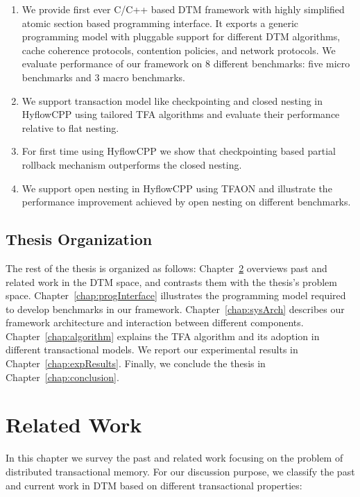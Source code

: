 \documentclass[12pt,english]{report}
\begin{document}
\begin{enumerate}
\item We provide first ever C/C++ based DTM framework with highly simplified atomic section based programming interface. It exports a generic programming model with pluggable support for different DTM algorithms, cache coherence protocols, contention policies, and network protocols. We evaluate performance of our framework on 8 different benchmarks: five micro benchmarks and 3 macro benchmarks.
\item We support transaction model like checkpointing and closed nesting in HyflowCPP using tailored TFA algorithms and evaluate their performance relative to flat nesting.  
\item For first time using HyflowCPP we show that checkpointing based partial rollback mechanism outperforms  the closed nesting. 
\item We support open nesting in HyflowCPP using TFAON and illustrate the performance improvement achieved by open nesting on different benchmarks.
\end{enumerate}

\section{Thesis Organization}

The rest of the thesis is organized as follows: Chapter~\ref{chap:relWork} overviews past and related work in the DTM space, and contrasts them with the thesis's problem space. Chapter~\ref{chap:progInterface} illustrates the programming model required to develop benchmarks in our framework. Chapter~\ref{chap:sysArch} describes our framework architecture and interaction between different components. Chapter~\ref{chap:algorithm} explains the TFA algorithm and its adoption in different transactional models. We report our experimental results in Chapter~\ref{chap:expResults}. Finally, we conclude the thesis in Chapter~\ref{chap:conclusion}.

\chapter{Related Work}\label{chap:relWork}

In this chapter we survey the past and related work focusing on the problem of distributed transactional memory. For our discussion purpose, we classify the past and current work in DTM based on different transactional properties:
\end{document}
